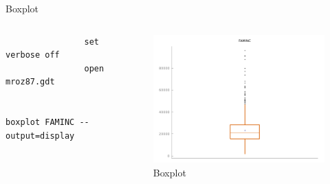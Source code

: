 \documentclass{beamer}[11pt]
\begin{document}
\begin{frame}[fragile]{Boxplot}
	\begin{columns}[T] %
		\scriptsize
		\begin{column}{.4\textwidth}
			\begin{verbatim}
				set verbose off
				open mroz87.gdt

				boxplot FAMINC --output=display
			\end{verbatim}
		\end{column}

		\begin{column}{.6\textwidth}
			\begin{figure}
				\includegraphics[width=1.0\textwidth]{../figures/boxplot.png}
				\caption{Boxplot}
			\end{figure}
	  \end{column}
	\end{columns}
\end{frame}
\end{document}
